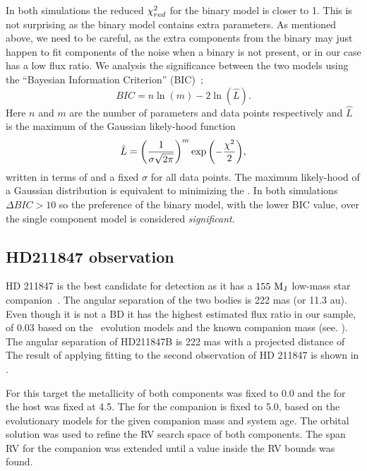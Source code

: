 In both simulations the reduced \({\chi}^{2}_{red}\) for the binary model is closer to 1. This is not surprising as the binary model contains extra parameters. As mentioned above, we need to be careful, as the extra components from the binary may just happen to fit components of the noise when a binary is not present, or in our case has a low flux ratio.
{\red{} We analysis the significance between the two models using the ``Bayesian Information Criterion'' ({BIC})~\citep{schwarz_estimating_1978}; }
\begin{equation}
{BIC} = n\ln{(m)} - 2\ln{(\hat{L})}.
\end{equation}
{\red{} Here \(n\) and \(m\) are the number of parameters and data points respectively and \(\hat{L}\) is the maximum of the Gaussian likely-hood function }
\begin{equation}
\hat{L} = {\left(\frac{1}{\sigma \sqrt{2\pi}}\right)}^{m} \exp{\left(-\frac{{\chi}^{2}}{2}\right)},
\end{equation}
{\red{} written in terms of \textchisquared{} and a fixed \(\sigma\) for all data points. The maximum likely-hood of a Gaussian distribution is equivalent  to minimizing the \textchisquared. In both simulations \(\Delta {BIC} >10\) so the preference of the binary model, with the lower {BIC} value, over the single component model is considered \emph{significant}.}



\subsection{HD211847 observation}
\label{subsection:results-hd211847}
{HD 211847} is the best candidate for detection as it has a \(\rm 155~M_J\) low-mass star companion~\citet{moutou_eccentricity_2017}. The angular separation of the two bodies is 222 mas (or 11.3 au). Even though it is not a {BD} it has the highest estimated flux ratio in our sample, of 0.03 based on the~\citet{baraffe_new_2015} evolution models and the known companion mass (see. ). The angular separation of HD211847B is 222 mas with a projected distance of The result of applying \textchisquared{} fitting to the second observation of {HD 211847} is shown in .

For this target the metallicity of both components was fixed to 0.0 and the \logg{} for the host was fixed at 4.5. The \logg{} for the companion is fixed to 5.0, based on the~\citet{baraffe_new_2015} evolutionary models for the given companion mass and system age. The orbital solution was used to refine the {RV} search space of both components. The span {RV} for the companion was extended until a value inside the {RV} bounds was found.

